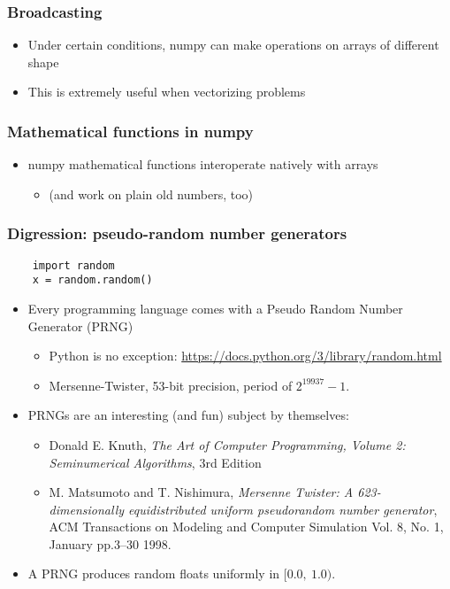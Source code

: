 \documentclass[9pt]{beamer}
\begin{document}
\begin{frame}
  \frametitle{Broadcasting}
  
  
  \begin{itemize}
  \item Under certain conditions, numpy can make operations on arrays of
    different shape
  \item This is extremely useful when vectorizing problems 
  \end{itemize}
\end{frame}



\begin{frame}
  \frametitle{Mathematical functions in numpy}
  
  
  \begin{itemize}
  \item numpy mathematical functions interoperate natively with arrays
    \begin{itemize}
    \item (and work on plain old numbers, too)
    \end{itemize}
  \end{itemize}
\end{frame}


\begin{frame}[fragile]
  \frametitle{Digression: pseudo-random number generators}

  \begin{Verbatim}
    import random
    x = random.random()
  \end{Verbatim}

  \medskip
  
  \begin{itemize}
  \item Every programming language comes with a Pseudo Random Number
    Generator (PRNG)
    \begin{itemize}
    \item Python is no exception:
      \url{https://docs.python.org/3/library/random.html}
    \item Mersenne-Twister, 53-bit precision, period of $2^{19937} - 1$. 
    \end{itemize}
  \item PRNGs are an interesting (and fun) subject by themselves:
    \begin{itemize}
    \item Donald E. Knuth, \emph{The Art of Computer Programming, Volume 2: Seminumerical Algorithms}, 3rd Edition 
    \item M. Matsumoto and T. Nishimura, \emph{Mersenne Twister: A 623-dimensionally equidistributed uniform pseudorandom number generator}, ACM Transactions on Modeling and Computer Simulation Vol. 8, No. 1, January pp.3--30 1998.
    \end{itemize}
  \item A PRNG produces random floats uniformly in $[0.0,~1.0)$.
  \end{itemize}
\end{frame}
\end{document}
